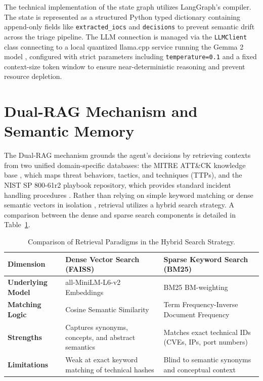 The technical implementation of the state graph utilizes LangGraph's compiler. The state is represented as a structured Python typed dictionary containing append-only fields like \texttt{extracted\_iocs} and \texttt{decisions} to prevent semantic drift across the triage pipeline. The LLM connection is managed via the \texttt{LLMClient} class connecting to a local quantized llama.cpp service running the Gemma 2 model \cite{gemma_2_2024}, configured with strict parameters including \texttt{temperature=0.1} and a fixed context-size token window to ensure near-deterministic reasoning and prevent resource depletion.

\section{Dual-RAG Mechanism and Semantic Memory}

The Dual-RAG mechanism grounds the agent's decisions by retrieving contexts from two unified domain-specific databases: the MITRE ATT\&CK knowledge base \cite{strom2018mitre}, which maps threat behaviors, tactics, and techniques (TTPs), and the NIST SP 800-61r2 playbook repository, which provides standard incident handling procedures \cite{nist80061}. Rather than relying on simple keyword matching or dense semantic vectors in isolation \cite{rag2020}, retrieval utilizes a hybrid search strategy. A comparison between the dense and sparse search components is detailed in Table~\ref{tab:search_comparison}.

\begin{table}[H]
    \centering
    \caption{Comparison of Retrieval Paradigms in the Hybrid Search Strategy.}
    \label{tab:search_comparison}
    \begin{tabular}{|>{\raggedright\arraybackslash}p{}|>{\raggedright\arraybackslash}p{}|>{\raggedright\arraybackslash}p{}|}
        \hline
        \textbf{Dimension} & \textbf{Dense Vector Search (FAISS)} & \textbf{Sparse Keyword Search (BM25)} \\
        \hline
        \textbf{Underlying Model} & all-MiniLM-L6-v2 Embeddings \cite{reimers2019sentence} & BM25 BM-weighting \\
        \hline
        \textbf{Matching Logic} & Cosine Semantic Similarity \cite{faiss2019} & Term Frequency-Inverse Document Frequency \cite{bm25_2009} \\
        \hline
        \textbf{Strengths} & Captures synonyms, concepts, and abstract semantics & Matches exact technical IDs (CVEs, IPs, port numbers) \\
        \hline
        \textbf{Limitations} & Weak at exact keyword matching of technical hashes & Blind to semantic synonyms and conceptual context \\
        \hline
    \end{tabular}
\end{table}

